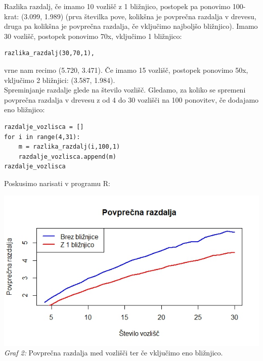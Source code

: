 \documentclass[a4paper,10pt]{article}
\begin{document}
Razlika razdalj, če imamo 10 vozlišč z 1 bližnjico, postopek pa ponovimo 100-krat:  (3.099, 1.989) (prva številka pove, kolikšna je povprečna razdalja v drevesu, druga pa kolikšna je povprečna razdalja, če vključimo najboljšo bližnjico).
\newline
Imamo 30 vozlišč, postopek ponovimo 70x, vključimo 1 bližnjico:
\begin{verbatim}
razlika_razdalj(30,70,1),
\end{verbatim}
vrne nam recimo (5.720, 3.471).
Če imamo 15 vozlišč, postopek ponovimo 50x, vključimo 2  bližnjici: (3.587, 1.984).
\\[0.5cm]
Spreminjanje razdalje glede na število vozlišč. Gledamo, za koliko se spremeni povprečna razdalja v drevesu z od 4 do 30 vozlišči na 100 ponovitev, če dodajamo eno bližnjico:
\begin{verbatim}
razdalje_vozlisca = []
for i in range(4,31):
    m = razlika_razdalj(i,100,1)
    razdalje_vozlisca.append(m)
razdalje_vozlisca
\end{verbatim}
Poskusimo narisati v programu R:
\begin{center}
\includegraphics[scale = 0.75]{povp_razd}\\ 
\scriptsize{\textit{Graf 2: } Povprečna razdalja med vozlišči ter če vključimo eno bližnjico.}
\end{center}
\end{document}
